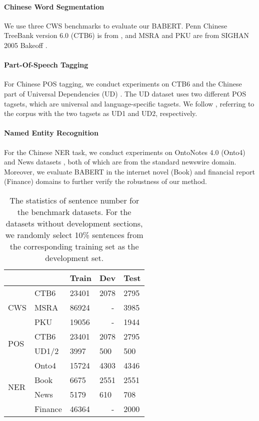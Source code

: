 \documentclass[11pt]{article}
\begin{document}
\begin{CJK}{UTF8}{gbsn}
\paragraph{Chinese Word Segmentation}
We use three CWS benchmarks to evaluate our BABERT.
Penn Chinese TreeBank version 6.0 (CTB6) is from \citet{xue2005penn},
and MSRA and PKU are from SIGHAN 2005 Bakeoff \cite{emerson-2005-second}.

\paragraph{Part-Of-Speech Tagging}
For Chinese POS tagging, we conduct experiments on CTB6 \cite{xue2005penn} and the Chinese part of Universal Dependencies (UD) \cite{nivre2016universal}.
The UD dataset uses two different POS tagsets, which are universal and language-specific tagsets.
We follow \citet{shao-etal-2017-character},
referring to the corpus with the two tagsets as UD1 and UD2, respectively.



\paragraph{Named Entity Recognition}
For the Chinese NER task, we conduct experiments on OntoNotes 4.0 (Onto4) \cite{weischedel2011ontonotes} and News datasets \cite{jia-etal-2020-entity}, both of which are from the standard newswire domain.
Moreover, we evaluate BABERT in the internet novel (Book) and financial report (Finance) domains \cite{jia-etal-2020-entity} to further verify the robustness of our method.


\begin{table}[]
  \centering
  {
\begin{tabular}{@{}ll|lll@{}}
  \toprule
                       &         & Train   & Dev   & Test   \\ \midrule
  \multirow{3}{*}{CWS} & CTB6    & 23401   & 2078  & 2795   \\
                       & MSRA    & 86924   & ~~~-  & 3985   \\
                       & PKU     & 19056   & ~~~-  & 1944   \\ \hline
  \multirow{2}{*}{POS} & CTB6    & 23401   & 2078  & 2795   \\
                       & UD1/2   & 3997    & 500   & 500    \\ \hline
  \multirow{4}{*}{NER} & Onto4    & 15724   & 4303  & 4346   \\
                       & Book    & 6675    & 2551  & 2551   \\
                       & News    & 5179    & 610   & 708    \\
                       & Finance & 46364   & ~~~-  & 2000   \\ \bottomrule
  \end{tabular}}
  \caption{
  The statistics of sentence number for the benchmark datasets.
  For the datasets without development sections, we randomly select 10\% sentences from the corresponding training set as the development set.
  }
  \label{tab:datasets}
\end{table}


\end{CJK}
\end{document}
